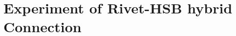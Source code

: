 \chapter{Experiment of Rivet-HSB hybrid Connection}
\label{ch4}

\begin{spacing}{1.25} %
\minitoc %
\end{spacing} %
\onehalfspacing %

\kant[1-2]